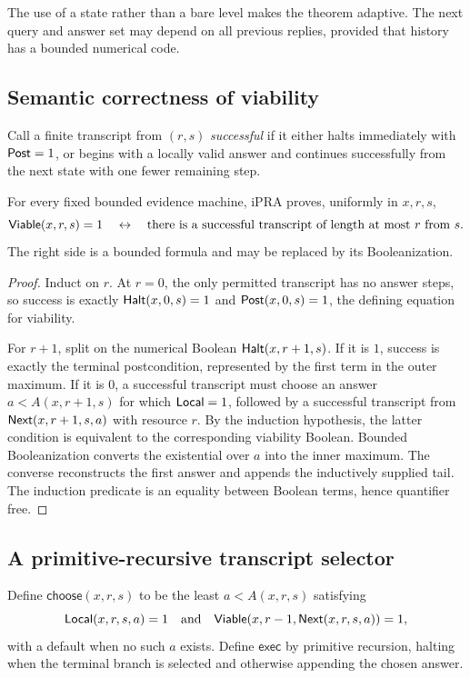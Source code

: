 The use of a state rather than a bare level makes the theorem adaptive.  The next query and answer set may depend on all previous replies, provided that history has a bounded numerical code.

\subsection{Semantic correctness of viability}

Call a finite transcript from $(r,s)$ \emph{successful} if it either halts immediately with $\mathsf{Post}=1$, or begins with a locally valid answer and continues successfully from the next state with one fewer remaining step.

\begin{theorem}
\label{thm:viability}
For every fixed bounded evidence machine, iPRA proves, uniformly in $x,r,s$,
\[
 \mathsf{Viable}(x,r,s)=1
 \quad\leftrightarrow\quad
 \text{there is a successful transcript of length at most $r$ from $s$}.
\]
The right side is a bounded formula and may be replaced by its Booleanization.
\end{theorem}

\begin{proof}
Induct on $r$.  At $r=0$, the only permitted transcript has no answer steps, so success is exactly $\mathsf{Halt}(x,0,s)=1$ and $\mathsf{Post}(x,0,s)=1$, the defining equation for viability.

For $r+1$, split on the numerical Boolean $\mathsf{Halt}(x,r+1,s)$.  If it is $1$, success is exactly the terminal postcondition, represented by the first term in the outer maximum.  If it is $0$, a successful transcript must choose an answer $a<A(x,r+1,s)$ for which $\mathsf{Local}=1$, followed by a successful transcript from $\mathsf{Next}(x,r+1,s,a)$ with resource $r$.  By the induction hypothesis, the latter condition is equivalent to the corresponding viability Boolean.  Bounded Booleanization converts the existential over $a$ into the inner maximum.  The converse reconstructs the first answer and appends the inductively supplied tail.  The induction predicate is an equality between Boolean terms, hence quantifier free.
\end{proof}

\subsection{A primitive-recursive transcript selector}

Define $\mathsf{choose}(x,r,s)$ to be the least $a<A(x,r,s)$ satisfying
\[
 \mathsf{Local}(x,r,s,a)=1\quad\text{and}\quad
 \mathsf{Viable}(x,r-1,\mathsf{Next}(x,r,s,a))=1,
\]
with a default when no such $a$ exists.  Define $\mathsf{exec}$ by primitive recursion, halting when the terminal branch is selected and otherwise appending the chosen answer.

